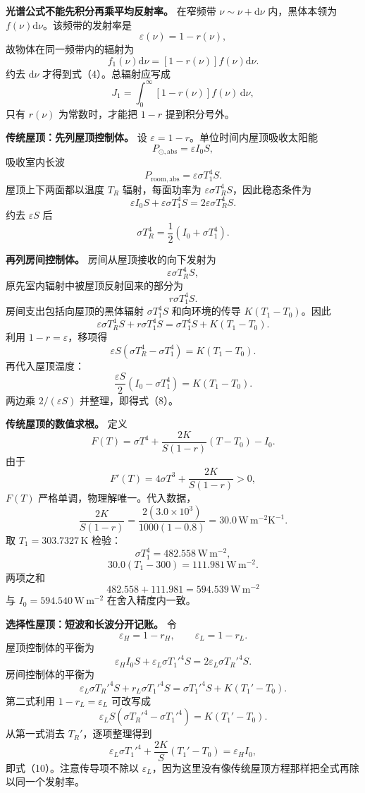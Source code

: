 \documentclass[12pt,a4paper,UTF8]{ctexart}
\begin{document}
\textbf{光谱公式不能先积分再乘平均反射率。} 在窄频带
\(\nu\sim\nu+\mathrm d\nu\) 内，黑体本领为
\(f(\nu)\mathrm d\nu\)。该频带的发射率是 \[
\varepsilon(\nu)=1-r(\nu),
\] 故物体在同一频带内的辐射为 \[
f_1(\nu)\mathrm d\nu
=[1-r(\nu)]f(\nu)\mathrm d\nu.
\] 约去 \(\mathrm d\nu\) 才得到式（4）。总辐射应写成 \[
J_1=\int_0^\infty[1-r(\nu)]f(\nu)\,\mathrm d\nu,
\] 只有 \(r(\nu)\) 为常数时，才能把 \(1-r\) 提到积分号外。

\textbf{传统屋顶：先列屋顶控制体。} 设
\(\varepsilon=1-r\)。单位时间内屋顶吸收太阳能 \[
P_{\odot,\mathrm{abs}}=\varepsilon I_0S,
\] 吸收室内长波 \[
P_{\mathrm{room},\mathrm{abs}}
=\varepsilon\sigma T_1^4S.
\] 屋顶上下两面都以温度 \(T_R\) 辐射，每面功率为
\(\varepsilon\sigma T_R^4S\)，因此稳态条件为 \[
\varepsilon I_0S+\varepsilon\sigma T_1^4S
=2\varepsilon\sigma T_R^4S.
\] 约去 \(\varepsilon S\) 后 \[
\sigma T_R^4=\frac12\left(I_0+\sigma T_1^4\right).
\]

\textbf{再列房间控制体。} 房间从屋顶接收的向下发射为 \[
\varepsilon\sigma T_R^4S,
\] 原先室内辐射中被屋顶反射回来的部分为 \[
r\sigma T_1^4S.
\] 房间支出包括向屋顶的黑体辐射 \(\sigma T_1^4S\) 和向环境的传导
\(K(T_1-T_0)\)。因此 \[
\varepsilon\sigma T_R^4S
+r\sigma T_1^4S
=\sigma T_1^4S+K(T_1-T_0).
\] 利用 \(1-r=\varepsilon\)，移项得 \[
\varepsilon S\left(\sigma T_R^4-\sigma T_1^4\right)
=K(T_1-T_0).
\] 再代入屋顶温度： \[
\frac{\varepsilon S}{2}
\left(I_0-\sigma T_1^4\right)
=K(T_1-T_0).
\] 两边乘 \(2/(\varepsilon S)\) 并整理，即得式（8）。

\textbf{传统屋顶的数值求根。} 定义 \[
F(T)=\sigma T^4+
\frac{2K}{S(1-r)}(T-T_0)-I_0.
\] 由于 \[
F'(T)=4\sigma T^3+\frac{2K}{S(1-r)}>0,
\] \(F(T)\) 严格单调，物理解唯一。代入数据， \[
\frac{2K}{S(1-r)}
=\frac{2(3.0\times10^3)}
{1000(1-0.8)}
=30.0\,\mathrm{W\,m^{-2}K^{-1}}.
\] 取 \(T_1=303.7327\,\mathrm K\) 检验： \[
\sigma T_1^4=482.558\,\mathrm{W\,m^{-2}},
\] \[
30.0(T_1-300)
=111.981\,\mathrm{W\,m^{-2}}.
\] 两项之和 \[
482.558+111.981
=594.539\,\mathrm{W\,m^{-2}}
\] 与 \(I_0=594.540\,\mathrm{W\,m^{-2}}\) 在舍入精度内一致。

\textbf{选择性屋顶：短波和长波分开记账。} 令 \[
\varepsilon_H=1-r_H,\qquad
\varepsilon_L=1-r_L.
\] 屋顶控制体的平衡为 \[
\varepsilon_HI_0S
+\varepsilon_L\sigma T_1'^4S
=2\varepsilon_L\sigma T_R'^4S.
\] 房间控制体的平衡为 \[
\varepsilon_L\sigma T_R'^4S
+r_L\sigma T_1'^4S
=\sigma T_1'^4S+K(T_1'-T_0).
\] 第二式利用 \(1-r_L=\varepsilon_L\) 可改写成 \[
\varepsilon_LS
\left(\sigma T_R'^4-\sigma T_1'^4\right)
=K(T_1'-T_0).
\] 从第一式消去 \(T_R'\)，逐项整理得到 \[
\varepsilon_L\sigma T_1'^4
+\frac{2K}{S}(T_1'-T_0)
=\varepsilon_HI_0,
\] 即式（10）。注意传导项不除以
\(\varepsilon_L\)，因为这里没有像传统屋顶方程那样把全式再除以同一个发射率。
\end{document}

